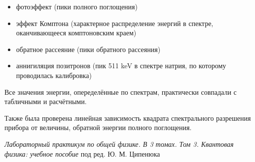 \documentclass[12pt,a4paper]{article}
\begin{document}
\begin{itemize}
    \item фотоэффект (пики полного поглощения)
    \item эффект Комптона (характерное распределение энергий в спектре, оканчивающееся комптоновским краем)
    \item обратное рассеяние (пики обратного рассеяния)
    \item аннигиляция позитронов (пик 511 keV в спектре натрия, по которому проводилась калибровка)
\end{itemize}

Все значения энергии, опеределённые по спектрам, практически совпадали с табличными и расчётными. \par

Также была проверена линейная зависимость квадрата спектрального разрешения прибора от величины, обратной энергии полного поглощения.

\vfill
    
\begin{thebibliography}{9}
	 \emph{Лабораторный практикум по общей физике. В 3 томах. Том 3. Квантовая физика: учебное пособие} под ред. Ю. М. Ципенюка
\end{thebibliography}
\end{document}
